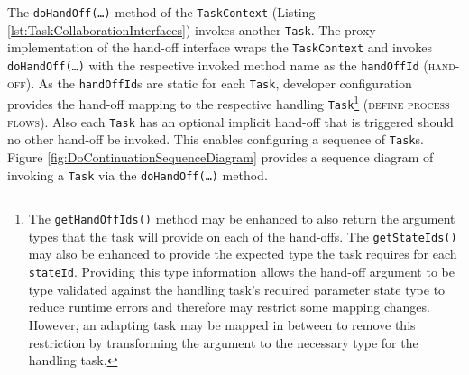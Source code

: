 \documentclass[prodmode]{style/acmlarge}
\begin{document}
The \texttt{doHandOff(\ldots)} method of the \texttt{TaskContext} (Listing
\ref{lst:TaskCollaborationInterfaces}) invokes another \texttt{Task}.  The proxy
implementation of the hand-off interface wraps the \texttt{TaskContext} and
invokes \texttt{doHandOff(\ldots)} with the respective invoked method name as
the \texttt{handOffId} (\textsc{hand-off}).  As the \texttt{handOffId}s are
static for each \texttt{Task}, developer configuration provides the hand-off
mapping to the respective handling \texttt{Task}\footnote{The
\texttt{getHandOffIds()} method may be enhanced to also return the argument
types that the task will provide on each of the hand-offs.  The
\texttt{getStateIds()} may also be enhanced to provide the expected type the
task requires for each \texttt{stateId}.  Providing this type information allows
the hand-off argument to be type validated against the handling task's required
parameter state type to reduce runtime errors and therefore may restrict some
mapping changes.
However, an adapting task may be mapped in between to remove this restriction by
transforming the argument to the necessary type for the handling task.}
(\textsc{define process flows}).  Also each \texttt{Task} has an optional
implicit hand-off that is triggered should no other hand-off be invoked.  This
enables configuring a sequence of \texttt{Task}s.  Figure
\ref{fig:DoContinuationSequenceDiagram} provides a sequence diagram of invoking
a \texttt{Task} via the \texttt{doHandOff(\ldots)} method.  
\end{document}
